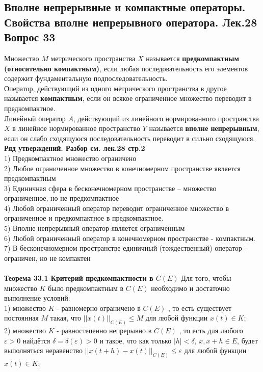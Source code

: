 \documentclass{article}
\begin{document}
\subsection{Вполне непрерывные и компактные операторы. Свойства вполне непрерывного оператора. Лек.28 \textbf{Вопрос 33}}
	Множество $M$ метрического пространства $X$	называется \textbf{предкомпактным (относительно компактным)}, если любая
	последовательность его элементов содержит фундаментальную
	подпоследовательность.\\
	Оператор, действующий из одного метрического пространства в другое называется \textbf{компактным}, если он всякое ограниченное множество переводит в предкомпактное.\\
	Линейный оператор $A$, действующий из линейного
	нормированного пространства $X$ в линейное нормированное пространство $Y$	называется \textbf{вполне непрерывным}, если он слабо сходящуюся
	последовательность переводит в сильно сходящуюся.\\
	\textbf{Ряд утверждений. Разбор см. лек.28 стр.2}\\
	1) Предкомпактное множество ограничено\\
	2) Любое ограниченное множество в конечномерном пространстве
	является предкомпактным\\
	3) Единичная сфера в бесконечномерном пространстве – множество ограниченное, но не предкомпактное\\
	4) Любой ограниченный оператор переводит ограниченное множество в
	ограниченное и предкомпактное в предкомпактное. \\
	5) Вполне непрерывный оператор является ограниченным\\
	6) Любой ограниченный оператор в конечномерном пространстве - компактным.\\
	7) В бесконечномерном пространстве единичный (тождественный) оператор – ограничен, но не компактен\\
	\\
	\textbf{Теорема 33.1 Критерий предкомпактности в $C(E)$} Для того, чтобы
	множество $K$ было предкомпактным в $C(E)$ необходимо и достаточно
	выполнение условий:\\
	1) множество $K$ - равномерно ограничено в $C(E)$ , то есть
	существует постоянная $M$ такая, что ${||x(t)||}_{C(E)}\le M$ для любой функции $x(t)\in K$;\\
	2) множество $K$ - равностепенно непрерывно в $C(E)$ , то есть для
	любого $\varepsilon>0$ найдётся $\delta=\delta(\varepsilon)>0$ и такое, что как только $|h|<\delta$, $x,x+h\in E$, будет выполняться неравенство ${||x(t+h)-x(t)||}_{C(E)}\le \varepsilon$ для любой функции $x(t)\in K$;\\
\end{document}
